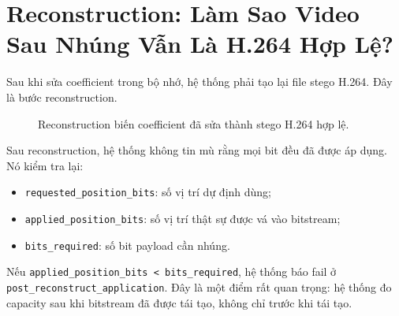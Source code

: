 \documentclass[11pt,a4paper]{article}
\begin{document}
\section{Reconstruction: Làm Sao Video Sau Nhúng Vẫn Là H.264 Hợp Lệ?}

Sau khi sửa coefficient trong bộ nhớ, hệ thống phải tạo lại file stego H.264.
Đây là bước reconstruction.

\begin{figure}[H]
\centering
{}
\caption{Reconstruction biến coefficient đã sửa thành stego H.264 hợp lệ.}
\label{fig:reconstruction}
\end{figure}

Sau reconstruction, hệ thống không tin mù rằng mọi bit đều đã được áp dụng.
Nó kiểm tra lại:

\begin{itemize}[leftmargin=*]
  \item \texttt{requested\_position\_bits}: số vị trí dự định dùng;
  \item \texttt{applied\_position\_bits}: số vị trí thật sự được vá vào bitstream;
  \item \texttt{bits\_required}: số bit payload cần nhúng.
\end{itemize}

Nếu \texttt{applied\_position\_bits < bits\_required}, hệ thống báo fail ở
\texttt{post\_reconstruct\_application}. Đây là một điểm rất quan trọng: hệ
thống đo capacity sau khi bitstream đã được tái tạo, không chỉ trước khi tái
tạo.
\end{document}
